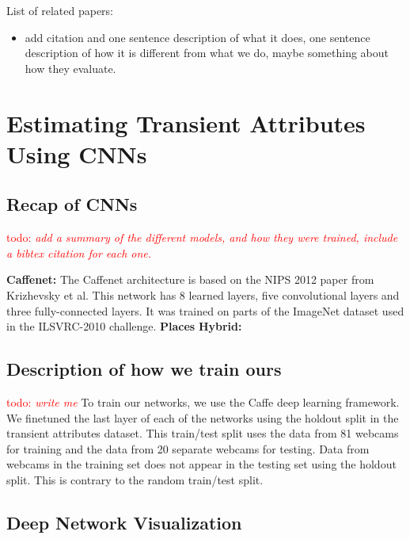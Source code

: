 \documentclass{article}
\newcommand{\todo}[1]{\textcolor{red}{todo: {\em #1}}}
\begin{document}
List of related papers:
\begin{itemize}

  \item add citation and one sentence description of what it does, one
    sentence description of how it is different from what we do, maybe
    something about how they evaluate.

\end{itemize}

\section{Estimating Transient Attributes Using CNNs}

\subsection{Recap of CNNs}

\todo{add a summary of the different models, and how they were
trained, include a bibtex citation for each one.}

\textbf{Caffenet:} The Caffenet architecture is based on the NIPS 2012 paper
from Krizhevsky\cite{caffenetnips12} et al.  This network has 8 learned layers, 
five convolutional layers and three fully-connected layers.  It was trained on 
parts of the ImageNet dataset used in the ILSVRC-2010\cite{ILSVRCarxiv14} 
challenge.
\newline\indent
\textbf{Places} \cite{zhou2014places}
\newline\indent
\textbf{Hybrid:} \cite{zhou2014places}

\subsection{Description of how we train ours}

\todo{write me}\newline 
\newline\indent
To train our networks, we use the Caffe \cite{caffe14} deep learning 
framework. We finetuned the last layer of each of the networks using the 
holdout split in the transient attributes dataset.  This train/test split uses
the data from 81 webcams for training and the data from 20 separate 
webcams for testing.  Data from webcams in the training set does not
appear in the testing set using the holdout split.  This is contrary to 
the random train/test split.  

\subsection{Deep Network Visualization}
\end{document}
